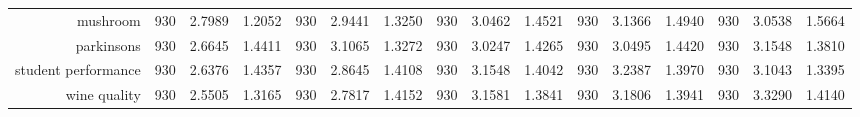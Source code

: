 \begin{table}[htbp]
{\begin{tabular}{rccccccccccccccc}
			mushroom                            & 930                                     & \cellcolor[rgb]{ .776,  .937,  .808}\textcolor[rgb]{ 0,  .38,  0}{2.7989}          & 1.2052          & 930                             & 2.9441                                                                    & 1.3250          & 930                             & 3.0462          & 1.4521          & 930                             & 3.1366                                                                    & 1.4940          & 930                             & 3.0538                                                                    & 1.5664          \\
			parkinsons                          & 930                                     & \cellcolor[rgb]{ .776,  .937,  .808}\textcolor[rgb]{ 0,  .38,  0}{2.6645}          & 1.4411          & 930                             & 3.1065                                                                    & 1.3272          & 930                             & 3.0247          & 1.4265          & 930                             & 3.0495                                                                    & 1.4420          & 930                             & 3.1548                                                                    & 1.3810          \\
			student performance                 & 930                                     & \cellcolor[rgb]{ .776,  .937,  .808}\textcolor[rgb]{ 0,  .38,  0}{2.6376}          & 1.4357          & 930                             & 2.8645                                                                    & 1.4108          & 930                             & 3.1548          & 1.4042          & 930                             & 3.2387                                                                    & 1.3970          & 930                             & 3.1043                                                                    & 1.3395          \\
			wine quality                        & 930                                     & \cellcolor[rgb]{ .776,  .937,  .808}\textcolor[rgb]{ 0,  .38,  0}{2.5505}          & 1.3165          & 930                             & 2.7817                                                                    & 1.4152          & 930                             & 3.1581          & 1.3841          & 930                             & 3.1806                                                                    & 1.3941          & 930                             & 3.3290                                                                    & 1.4140          \\

\end{tabular}}
\end{table}
